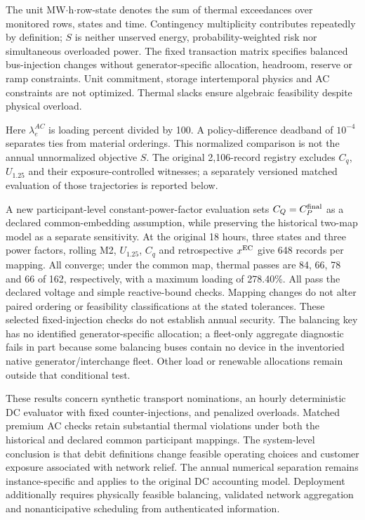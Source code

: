 
The unit MW$\cdot$h$\cdot$row-state denotes the sum of thermal exceedances over monitored rows, states and time. Contingency multiplicity contributes repeatedly by definition; $S$ is neither unserved energy, probability-weighted risk nor simultaneous overloaded power. The fixed transaction matrix specifies balanced bus-injection changes without generator-specific allocation, headroom, reserve or ramp constraints. Unit commitment, storage intertemporal physics and AC constraints are not optimized. Thermal slacks ensure algebraic feasibility despite physical overload.

Here $\lambda_e^{AC}$ is loading percent divided by 100. A policy-difference deadband of $10^{-4}$ separates ties from material orderings. This normalized comparison is not the annual unnormalized objective $S$. The original 2,106-record registry excludes $C_q$, $U_{1.25}$ and their exposure-controlled witnesses; a separately versioned matched evaluation of those trajectories is reported below.

A new participant-level constant-power-factor evaluation sets $C_Q=C_P^{\rm final}$ as a declared common-embedding assumption, while preserving the historical two-map model as a separate sensitivity. At the original 18 hours, three states and three power factors, rolling M2, $U_{1.25}$, $C_q$ and retrospective $x^{\rm EC}$ give 648 records per mapping. All converge; under the common map, thermal passes are 84, 66, 78 and 66 of 162, respectively, with a maximum loading of 278.40\%. All pass the declared voltage and simple reactive-bound checks. Mapping changes do not alter paired ordering or feasibility classifications at the stated tolerances. These selected fixed-injection checks do not establish annual security. The balancing key has no identified generator-specific allocation; a fleet-only aggregate diagnostic fails in part because some balancing buses contain no device in the inventoried native generator/interchange fleet. Other load or renewable allocations remain outside that conditional test.

These results concern synthetic transport nominations, an hourly deterministic DC evaluator with fixed counter-injections, and penalized overloads. Matched premium AC checks retain substantial thermal violations under both the historical and declared common participant mappings. The system-level conclusion is that debit definitions change feasible operating choices and customer exposure associated with network relief. The annual numerical separation remains instance-specific and applies to the original DC accounting model. Deployment additionally requires physically feasible balancing, validated network aggregation and nonanticipative scheduling from authenticated information.

